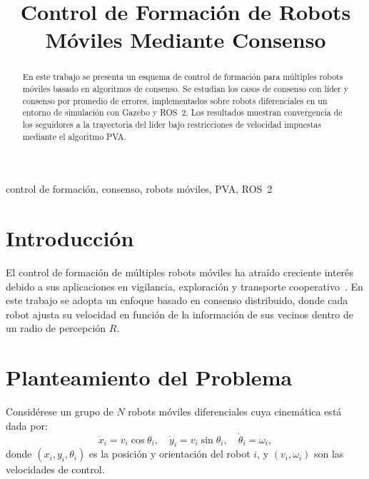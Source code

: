 \documentclass[conference]{IEEEtran}
\begin{document}
\title{Control de Formación de Robots Móviles Mediante Consenso}

\author{
}

\maketitle

\begin{abstract}
En este trabajo se presenta un esquema de control de formación para múltiples robots móviles basado en algoritmos de consenso. Se estudian los casos de consenso con líder y consenso por promedio de errores, implementados sobre robots diferenciales en un entorno de simulación con Gazebo y ROS~2. Los resultados muestran convergencia de los seguidores a la trayectoria del líder bajo restricciones de velocidad impuestas mediante el algoritmo PVA.
\end{abstract}

\begin{IEEEkeywords}
control de formación, consenso, robots móviles, PVA, ROS~2
\end{IEEEkeywords}

\section{Introducción}

El control de formación de múltiples robots móviles ha atraído creciente interés debido a sus aplicaciones en vigilancia, exploración y transporte cooperativo~\cite{olfati2007consensus}. En este trabajo se adopta un enfoque basado en consenso distribuido, donde cada robot ajusta su velocidad en función de la información de sus vecinos dentro de un radio de percepción $R$.

\section{Planteamiento del Problema}

Considérese un grupo de $N$ robots móviles diferenciales cuya cinemática está dada por:
\begin{equation}
  \dot{x}_i = v_i \cos\theta_i, \quad
  \dot{y}_i = v_i \sin\theta_i, \quad
  \dot{\theta}_i = \omega_i,
  \label{eq:cinematica}
\end{equation}
donde $(x_i, y_i, \theta_i)$ es la posición y orientación del robot $i$, y $(v_i, \omega_i)$ son las velocidades de control.
\end{document}
